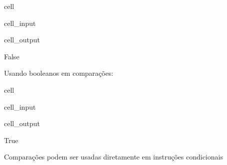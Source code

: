 \documentclass[letterpaper,10pt,english]{jupyterBook}
\begin{document}
\begin{sphinxuseclass}{cell}\begin{sphinxVerbatimInput}

\begin{sphinxuseclass}{cell_input}
\begin{sphinxVerbatim}[commandchars=\\\{\}]
   
\end{sphinxVerbatim}

\end{sphinxuseclass}\end{sphinxVerbatimInput}
\begin{sphinxVerbatimOutput}

\begin{sphinxuseclass}{cell_output}
\begin{sphinxVerbatim}[commandchars=\\\{\}]
False
\end{sphinxVerbatim}

\end{sphinxuseclass}\end{sphinxVerbatimOutput}

\end{sphinxuseclass}
\sphinxAtStartPar
Usando booleanos em comparações:

\begin{sphinxuseclass}{cell}\begin{sphinxVerbatimInput}

\begin{sphinxuseclass}{cell_input}
\begin{sphinxVerbatim}[commandchars=\\\{\}]
  
    
\end{sphinxVerbatim}

\end{sphinxuseclass}\end{sphinxVerbatimInput}
\begin{sphinxVerbatimOutput}

\begin{sphinxuseclass}{cell_output}
\begin{sphinxVerbatim}[commandchars=\\\{\}]
True
\end{sphinxVerbatim}

\end{sphinxuseclass}\end{sphinxVerbatimOutput}

\end{sphinxuseclass}
\sphinxAtStartPar
Comparações podem ser usadas diretamente em instruções condicionais
\end{document}
